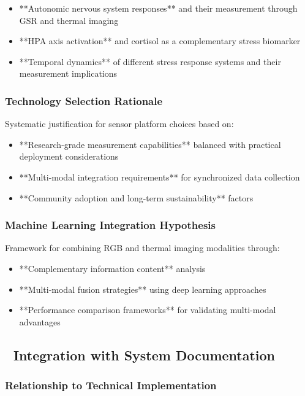 \documentclass[12pt,a4paper]{article}
\begin{document}
\begin{itemize}
\item **Autonomic nervous system responses** and their measurement through GSR and thermal imaging
\item **HPA axis activation** and cortisol as a complementary stress biomarker
\item **Temporal dynamics** of different stress response systems and their measurement implications

\end{itemize}
\subsubsection{Technology Selection Rationale}

Systematic justification for sensor platform choices based on:

\begin{itemize}
\item **Research-grade measurement capabilities** balanced with practical deployment considerations
\item **Multi-modal integration requirements** for synchronized data collection
\item **Community adoption and long-term sustainability** factors

\end{itemize}
\subsubsection{Machine Learning Integration Hypothesis}

Framework for combining RGB and thermal imaging modalities through:

\begin{itemize}
\item **Complementary information content** analysis
\item **Multi-modal fusion strategies** using deep learning approaches
\item **Performance comparison frameworks** for validating multi-modal advantages

\end{itemize}
\subsection{🔗 Integration with System Documentation}

\subsubsection{Relationship to Technical Implementation}
\end{document}

